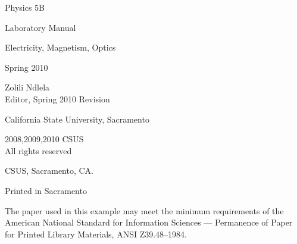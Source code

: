 
\newpage
\vspace*	{2in}
\begin{center}
	\HUGE\textsf{Physics 5B}\par
\end{center}
\begin{center}
	\LARGE\textsf{Laboratory Manual}\par
\end{center}
\begin{center}
	\HUGE\textsf{Electricity, Magnetism, Optics}\par
\end{center}
\begin{center}
	\Huge\textsf{Spring 2010}\par
\end{center}
\vfill
\begin{center}
	\LARGE\textsf{Zolili Ndlela\\Editor, Spring 2010 Revision}\par
\LARGE\textsf{California State University, Sacramento}\par
\end{center}
 
\vspace*{\fill}
\def\ZUN{Z\kern-0.2em U\kern-0.4em N}%
\def\ZUN{Z\kern-0.15em U\kern-0.3em N}%
\clearpage

\begingroup
\footnotesize
\setlength{\parindent}{0pt}
\setlength{\parskip}{\baselineskip}
\textcopyright{} 2008,2009,2010 CSUS \\
All rights reserved

CSUS, Sacramento, CA.

Printed in Sacramento 

The paper used in this example may meet the minimum requirements
of the American National Standard for Information 
Sciences --- Permanence of Paper for Printed Library Materials, 
ANSI Z39.48--1984.

